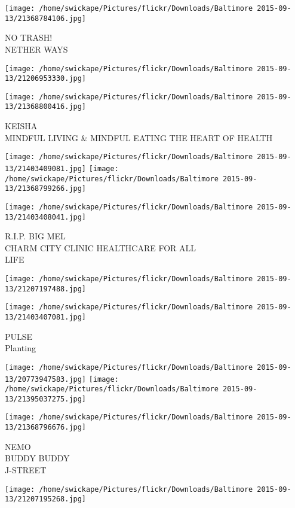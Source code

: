 \documentclass[10pt,letterpaper]{article}
\begin{document}
\vspace{0.25in}
\texttt{[image: /home/swickape/Pictures/flickr/Downloads/Baltimore 2015-09-13/21368784106.jpg]}

NO TRASH!\\
NETHER WAYS
\pagebreak

\texttt{[image: /home/swickape/Pictures/flickr/Downloads/Baltimore 2015-09-13/21206953330.jpg]}

\vspace{0.25in}
\texttt{[image: /home/swickape/Pictures/flickr/Downloads/Baltimore 2015-09-13/21368800416.jpg]}

KEISHA\\
MINDFUL LIVING \& MINDFUL EATING THE HEART OF HEALTH
\pagebreak

\texttt{[image: /home/swickape/Pictures/flickr/Downloads/Baltimore 2015-09-13/21403409081.jpg]}
\texttt{[image: /home/swickape/Pictures/flickr/Downloads/Baltimore 2015-09-13/21368799266.jpg]}

\vspace{0.25in}
\texttt{[image: /home/swickape/Pictures/flickr/Downloads/Baltimore 2015-09-13/21403408041.jpg]}

R.I.P. BIG MEL\\
CHARM CITY CLINIC HEALTHCARE FOR ALL\\
LIFE
\pagebreak

\texttt{[image: /home/swickape/Pictures/flickr/Downloads/Baltimore 2015-09-13/21207197488.jpg]}

\vspace{0.25in}
\texttt{[image: /home/swickape/Pictures/flickr/Downloads/Baltimore 2015-09-13/21403407081.jpg]}

PULSE\\
Planting
\pagebreak

\texttt{[image: /home/swickape/Pictures/flickr/Downloads/Baltimore 2015-09-13/20773947583.jpg]}
\texttt{[image: /home/swickape/Pictures/flickr/Downloads/Baltimore 2015-09-13/21395037275.jpg]}

\texttt{[image: /home/swickape/Pictures/flickr/Downloads/Baltimore 2015-09-13/21368796676.jpg]}

NEMO\\
BUDDY BUDDY\\
J{-}STREET
\pagebreak

\texttt{[image: /home/swickape/Pictures/flickr/Downloads/Baltimore 2015-09-13/21207195268.jpg]}
\end{document}

